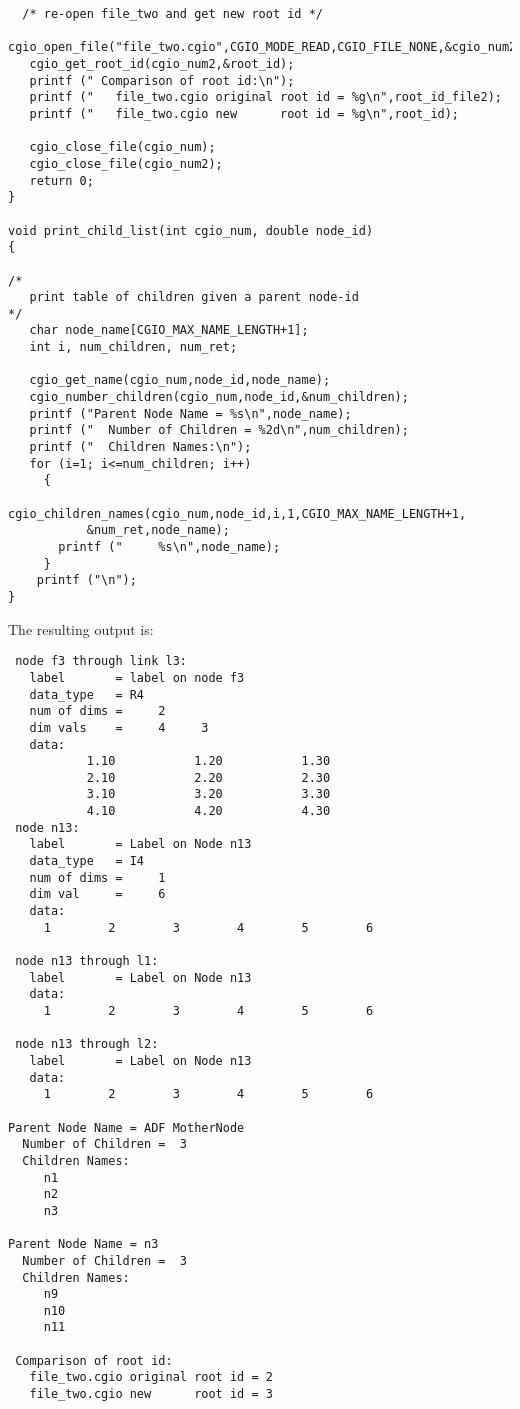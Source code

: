 \begin{verbatim}
  /* re-open file_two and get new root id */
   cgio_open_file("file_two.cgio",CGIO_MODE_READ,CGIO_FILE_NONE,&cgio_num2);
   cgio_get_root_id(cgio_num2,&root_id);
   printf (" Comparison of root id:\n");
   printf ("   file_two.cgio original root id = %g\n",root_id_file2);
   printf ("   file_two.cgio new      root id = %g\n",root_id);

   cgio_close_file(cgio_num);
   cgio_close_file(cgio_num2);
   return 0;
}

void print_child_list(int cgio_num, double node_id)
{

/*
   print table of children given a parent node-id
*/
   char node_name[CGIO_MAX_NAME_LENGTH+1];
   int i, num_children, num_ret;

   cgio_get_name(cgio_num,node_id,node_name);
   cgio_number_children(cgio_num,node_id,&num_children);
   printf ("Parent Node Name = %s\n",node_name);
   printf ("  Number of Children = %2d\n",num_children);
   printf ("  Children Names:\n");
   for (i=1; i<=num_children; i++)
     {
       cgio_children_names(cgio_num,node_id,i,1,CGIO_MAX_NAME_LENGTH+1,
           &num_ret,node_name);
       printf ("     %s\n",node_name);
     }
    printf ("\n");
}
\end{verbatim}

\noindent
The resulting output is:

\begin{verbatim}
 node f3 through link l3:
   label       = label on node f3
   data_type   = R4
   num of dims =     2
   dim vals    =     4     3
   data:
           1.10           1.20           1.30
           2.10           2.20           2.30
           3.10           3.20           3.30
           4.10           4.20           4.30
 node n13:
   label       = Label on Node n13
   data_type   = I4
   num of dims =     1
   dim val     =     6
   data:
     1        2        3        4        5        6

 node n13 through l1:
   label       = Label on Node n13
   data:
     1        2        3        4        5        6

 node n13 through l2:
   label       = Label on Node n13
   data:
     1        2        3        4        5        6

Parent Node Name = ADF MotherNode
  Number of Children =  3
  Children Names:
     n1
     n2
     n3

Parent Node Name = n3
  Number of Children =  3
  Children Names:
     n9
     n10
     n11

 Comparison of root id:
   file_two.cgio original root id = 2
   file_two.cgio new      root id = 3
\end{verbatim}

